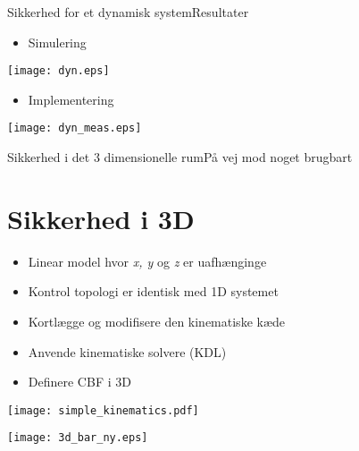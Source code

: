 \begin{frame}{Sikkerhed for et dynamisk system}{Resultater}
\hspace*{-0.5cm}
\begin{minipage}{0.46\textwidth}
	\begin{itemize}
		\item Simulering
	\end{itemize}
\texttt{[image: dyn.eps]}
\end{minipage}
\hspace{0.4cm}
\begin{minipage}{0.46\textwidth}
	\begin{itemize}
		\item Implementering
	\end{itemize}
\texttt{[image: dyn\_meas.eps]}
\end{minipage}

\end{frame}

\begin{frame}{Sikkerhed i det 3 dimensionelle rum}{På vej mod noget brugbart}
\section{Sikkerhed i 3D}
\vspace*{0.5cm}
\begin{itemize}
	\item Linear model hvor \textit{x, y} og \textit{z} er uafhænginge
	\item Kontrol topologi er identisk med 1D systemet
	\item Kortlægge og modifisere den kinematiske kæde
	\item Anvende kinematiske solvere (KDL)
	\item Definere CBF i 3D
\end{itemize}
\vspace*{-0.5cm}
\begin{minipage}{0.45\textwidth}
\texttt{[image: simple\_kinematics.pdf]}
\end{minipage}
\hspace*{0.8cm}
\begin{minipage}{0.45\textwidth}
\texttt{[image: 3d\_bar\_ny.eps]}
\end{minipage}
\end{frame}

